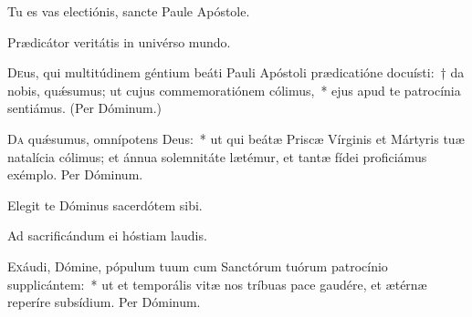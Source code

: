\documentclass[vesperale_romanum.tex]{subfiles}
\begin{document}

\vv Tu es vas electiónis, sancte Paule Apóstole.

\rr Prædicátor veritátis in univérso mundo.

\oratio

\lettrine{D}{e}us, qui multitúdinem géntium beáti Pauli Apóstoli prædicatióne docuísti:~† da nobis, quǽsumus; ut cujus commemoratiónem cólimus,~* ejus apud te patrocínia sentiámus. (Per Dóminum.)



\oratio

\lettrine{D}{a} quǽsumus, omnípotens Deus:~* ut qui beátæ Priscæ Vírginis et Mártyris tuæ natalícia cólimus; et ánnua sole\-mnitáte lætémur, et tantæ fídei proficiámus exémplo.
Per Dóminum.


 

\vv Elegit te Dóminus sacerdótem sibi.

\rr Ad sacrificándum ei hóstiam laudis.



\myrule


\simplex


\oratio

\lettrine{E}{x}áudi, Dómine, pópulum tuum cum Sanctórum tuórum patrocínio supplicántem:~* ut et temporális vitæ nos tríbuas pace gaudére, et ætérnæ reperíre subsídium.
Per Dóminum.
\end{document}
